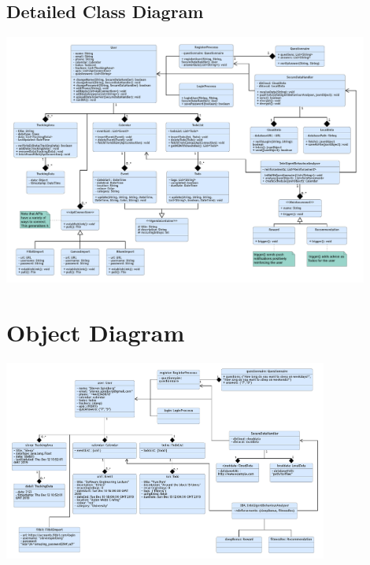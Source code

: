 \documentclass[a4paper,11pt]{article} %
\begin{document}
\subsection{Detailed Class Diagram}
\begin{center}
\includegraphics[angle=-90,width=0.9\textwidth]{img/Class_Diagram.pdf}
\end{center}
\newpage

\section{Object Diagram}
\begin{center}
    \includegraphics[angle=-90,width=0.8\textwidth]{img/Object_Diagram.pdf}
\end{center}
\newpage
\end{document}

